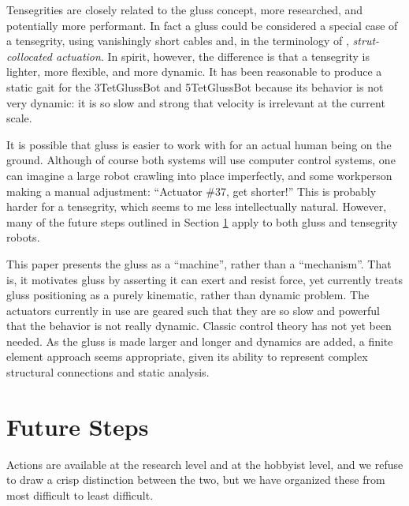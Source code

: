 \documentclass[11pt]{article}
\begin{document}
Tensegrities are closely related to the gluss concept, more researched, and potentially more performant.
In fact a gluss could be considered a special case of a tensegrity, using vanishingly short cables
and, in the terminology of \cite{paul2006}, \emph{strut-collocated actuation}.
In spirit, however, the difference is that a tensegrity is lighter, more flexible, and more dynamic.
It has been reasonable to produce a static gait for the 3TetGlussBot and 5TetGlussBot because its behavior is not
very dynamic: it is so slow and strong that velocity is irrelevant at the current scale.

It is possible that gluss is easier to work with for an actual human being on the ground.
Although of course both systems will use computer control systems, one can imagine a large robot
crawling into place imperfectly, and some workperson making a manual adjustment: ``Actuator \#37, get shorter!''
This is probably harder for a tensegrity, which seems to me less intellectually natural.  However, many
of the future steps outlined in Section \ref{futuresteps} apply to both gluss and tensegrity robots.

This paper presents the gluss as a ``machine'', rather than a ``mechanism''. That is, it motivates gluss
by asserting it can exert and resist force, yet currently treats gluss positioning as a purely kinematic,
rather than dynamic problem. The actuators currently in use are geared such that they are so slow
and powerful that the behavior is not really dynamic. Classic control theory has not yet been needed.
As the gluss is made larger and longer and dynamics are added,
a finite element approach\cite{géradin2001flexible} seems appropriate,
given its ability to represent complex structural connections and static analysis.



\section{Future Steps}
\label{futuresteps}

Actions are available at the research level and at the hobbyist level, and we refuse to draw
a crisp distinction between the two, but we have organized these from most difficult to least
difficult.
\end{document}
